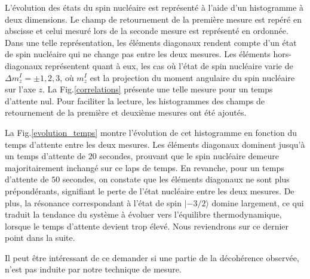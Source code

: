 L'évolution des états du spin nucléaire est représenté à l'aide d'un histogramme à deux dimensions. Le champ de retournement de la première mesure est repéré en abscisse et celui mesuré lors de la seconde mesure est représenté en ordonnée. Dans une telle représentation, les éléments diagonaux rendent compte d'un état de spin nucléaire qui ne change pas entre les deux mesures. Les éléments hors-diagonaux représentent quant à eux, les cas où l'état de spin nucléaire varie de $\Delta m_z^I = \pm 1,2,3$, où $m_z^I$ est la projection du moment angulaire du spin nucléaire sur l'axe $z$. La Fig.\ref{correlations} présente une telle mesure pour un temps d'attente nul. Pour faciliter la lecture, les histogrammes des champs de retournement de la première et deuxième mesures ont été ajoutés.

La Fig.\ref{evolution_temps} montre l'évolution de cet histogramme en fonction du temps d'attente entre les deux mesures. Les éléments diagonaux dominent jusqu'à un temps d'attente de $20$ secondes, prouvant que le spin nucléaire demeure majoritairement inchangé sur ce laps de temps. En revanche, pour un temps d'attente de $50$ secondes, on constate que les éléments diagonaux ne sont plus prépondérants, signifiant le perte de l'état nucléaire entre les deux mesures. De plus, la résonance correspondant à l'état de spin $|-3/2 \rangle$ domine largement, ce qui traduit la tendance du système à évoluer vers l'équilibre thermodynamique, lorsque le temps d'attente devient trop élevé. Nous reviendrons sur ce dernier point dans la suite.

Il peut être intéressant de ce demander si une partie de la décohérence observée, n'est pas induite par notre technique de mesure.

